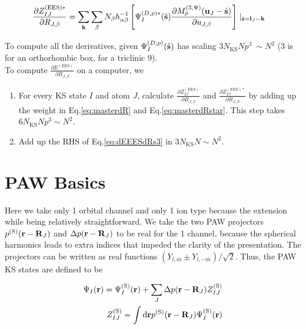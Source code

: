 \documentclass[paper=a4, fontsize=11pt]{article} %
\numberwithin{equation}{section} %
\numberwithin{figure}{section} %
\numberwithin{table}{section} %
\newcommand{\p}{\partial}
\newcommand{\bu}{{\bf{u}}}
\newcommand{\bl}{{\bf{l}}}
\newcommand{\bk}{{\bf{k}}}
\newcommand{\bs}{{\bf{s}}}
\newcommand{\br}{{\bf{r}}}
\newcommand{\bR}{{\bf{R}}}
\newcommand{\rS}{{\mathrm{S}}}
\newcommand{\rEES}{{\mathrm{EES}}}
\newcommand{\rd}{{\mathrm{d}}}
\newcommand{\al}{{\alpha}}
\newcommand{\RJb}{{R_{J,\beta}}}
\newcommand{\NKS}{{N_{\mathrm{KS}}}}
\newcommand{\Mp}{{M_p^{(3,\Psi)}}}
\begin{document}
\begin{equation}\label{eq:masterdRstar}
\begin{split}
\frac{\p Z_{IJ}^{(\rEES)*}}{\p \RJb}
&= \sum_\bk \sum_\beta  N_\beta h_{\al\beta}^{-1} \left[\Psi_I^{(D,p)*}(\hat \bs) \frac{\p \Mp(\bu_{J}-\hat \bs)}{\p u_{J,\beta}} \right]\mid_{\hat \bs = \bl_J-\bk}
\end{split}
\end{equation}

To compute all the derivatives, given $\Psi_I^{(D,p)}(\hat \bs)$ has scaling $3N_{\mathrm{KS}}Np^3 ~\sim N^2$ (3 is for an orthorhombic box, for a triclinic 9).
\\
To compute $\frac{\p E^{(\rEES)}}{\p \RJb}$ on a computer, we
\begin{enumerate}
\item For every KS state $I$ and atom $J$, calculate $\frac{\p Z_{IJ}^{(\rEES)}}{\p \RJb}$ and $\frac{\p Z_{IJ}^{(\rEES)*}}{\p \RJb}$ by adding up the weight in Eq.\eqref{eq:masterdR} and Eq.\eqref{eq:masterdRstar}. This step takes $6\NKS N p^3 \sim N^2$.
\item Add up the RHS of Eq.\eqref{eq:dEEESdRs3} in $3\NKS  N \sim N^2$.
\end{enumerate}








\newpage

\section{PAW Basics}

Here we take only 1 orbital channel and only 1 ion type because the extension while being relatively straightforward. We take the two PAW projectors $ p^{(\rS)}(\br-\bR_J)$ and $\Delta p(\br-\bR_J)$ to be real for the 1 channel, because the spherical harmonics leads to extra indices that impeded the clarity of the presentation. The projectors can be written as real functions $(Y_{l,m} \pm Y_{l,-m})/\sqrt{2}$. Thus, the PAW KS states are defined to be

\begin{equation}
\begin{split}
\Psi_I(\br) = \Psi_I^{(\rS)}(\br)+\sum_J \Delta p(\br-\bR_J)Z_{IJ}^{(\rS)} \\
Z_{IJ}^{(\rS)} = \int \rd\br p^{(\rS)}(\br-\bR_J)\Psi_I^{(\rS)}(\br) \\ 
\end{split}
\end{equation}
\end{document}
